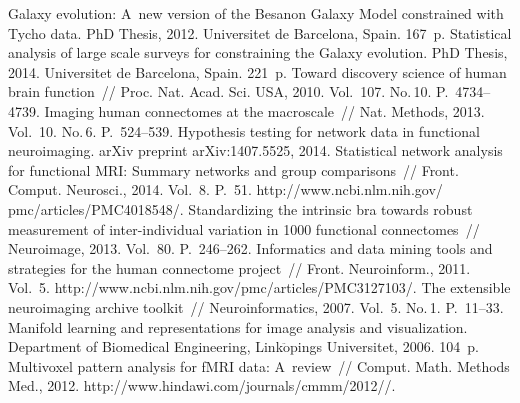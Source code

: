 \begin{multicols}{2}
{{\begin{thebibliography}{99}
 Galaxy evolution: A~new version of the
Besan{\!\fontsize{10pt}{10pt}\selectfont{}}on Galaxy
Model constrained with Tycho data. PhD Thesis, 2012. Universitet de
Barcelona, Spain. 167~p.
 Statistical analysis  of large scale surveys for constraining
the Galaxy evolution. PhD Thesis, 2014. Universitet de Barcelona, Spain.
221~p.
 Toward discovery science of human brain function~// Proc.
Nat. Acad. Sci. USA, 2010.  Vol.~107. No.\,10. P.~4734--4739.
 Imaging human connectomes at the macroscale~//
Nat. Methods, 2013. Vol.~10. No.\,6. P.~524--539.
 Hypothesis
testing for network data in functional neuroimaging. arXiv preprint arXiv:1407.5525,
2014.
 Statistical network analysis for
functional MRI: Summary networks and group comparisons~// Front.
Comput. Neurosci., 2014. Vol.~8. P.~51.
{\sf
http://www.ncbi.nlm.nih.gov/ pmc/articles/PMC4018548/}.
Standardizing the intrinsic bra towards robust measurement of inter-individual
variation in 1000 functional connectomes~// Neuroimage, 2013. Vol.~80.
P.~246--262.
 Informatics and data mining tools and strategies
for the human connectome project~// Front. Neuroinform., 2011.
Vol.~5. {\sf http://www.ncbi.nlm.nih.gov/pmc/\linebreak articles/PMC3127103/}.
 The extensible
neuroimaging archive toolkit~// Neuroinformatics, 2007. Vol.~5. No.\,1. P.~11--33.
 Manifold learning and representations for image analysis and
visualization. Department of Biomedical Engineering, Link$\ddot{\mbox{o}}$pings
Universitet, 2006. 104~p.
Multivoxel pattern analysis for fMRI data: A~review~// Comput.
Math. Methods Med., 2012.
{\sf
http://www.hindawi.com/journals/cmmm/2012//}.

\end{thebibliography}}}
\end{multicols}
